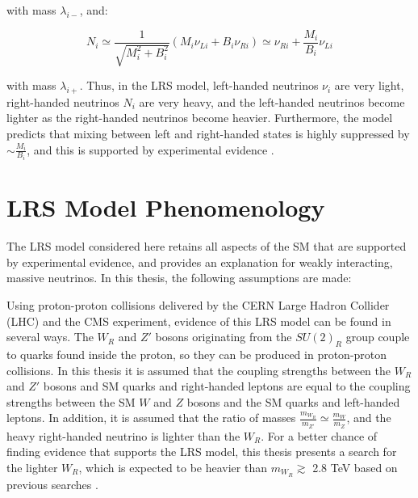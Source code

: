 with mass $\lambda_{i-}$, and:

\begin{equation}
	N_{i} \simeq \frac{1}{\sqrt{M^{2}_{i} + B^{2}_{i}}}(M_{i}\nu_{Li} + B_{i}\nu_{Ri}) \simeq \nu_{Ri} + \frac{M_{i}}{B_{i}}\nu_{Li}
\end{equation}

with mass $\lambda_{i+}$.  Thus, in the LRS model, left-handed neutrinos $\nu_{i}$ are very light,  
right-handed neutrinos $N_{i}$ are very heavy, and the left-handed neutrinos become lighter as 
the right-handed neutrinos become heavier.  Furthermore, the model predicts that mixing between left 
and right-handed states is highly suppressed by $\sim \frac{M_{i}}{B_{i}}$, and this is supported by 
experimental evidence \cite{dZeroMixingLimits,theoreticalMixingLimits}.


\section{LRS Model Phenomenology}
The LRS model considered here retains all aspects of the SM that are supported by experimental 
evidence, and provides an explanation for weakly interacting, massive neutrinos.  In this thesis, the 
following assumptions are made:


Using proton-proton collisions delivered by the CERN Large Hadron Collider (LHC) and the CMS experiment, 
evidence of this LRS model can be found in several ways.  The $W_{R}$ and $Z'$ 
bosons originating from the $SU(2)_{R}$ group couple to quarks found inside the proton, so they 
can be produced in proton-proton collisions.  In this thesis it is assumed that the coupling 
strengths between the $W_{R}$ and $Z'$ bosons and SM quarks and right-handed leptons are equal 
to the coupling strengths between the SM $W$ and $Z$ bosons and the SM quarks and left-handed 
leptons.  In addition, it is assumed that the ratio of masses $\frac{m_{W_{R}}}{m_{Z'}} \simeq \frac{m_{W}}{m_{Z}}$, 
and the heavy right-handed neutrino is lighter than the $W_{R}$.  For a better chance of finding 
evidence that supports the LRS model, this thesis presents a search for the lighter $W_{R}$, which 
is expected to be heavier than $m_{W_{R}} \gtrsim$ 2.8 TeV based on previous searches \cite{cmsWRRunOneResults}.

